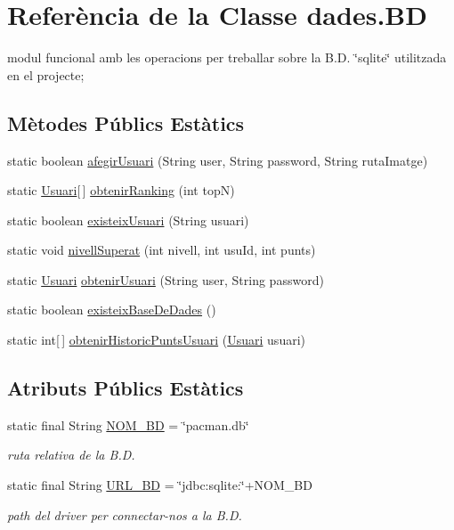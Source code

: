\hypertarget{classdades_1_1_b_d}{\section{Referència de la Classe dades.\+B\+D}
\label{classdades_1_1_b_d}
}


modul funcional amb les operacions per treballar sobre la B.\+D. \char`\"{}sqlite\char`\"{} utilitzada en el projecte;  


\subsection*{Mètodes Públics Estàtics}
\begin{DoxyCompactItemize}
\item 
static boolean \hyperlink{classdades_1_1_b_d_aebeb79a5b559c404967e7af4a51fbe07}{afegir\+Usuari} (String user, String password, String ruta\+Imatge)
\item 
static \hyperlink{classlogica_1_1_usuari}{Usuari}\mbox{[}$\,$\mbox{]} \hyperlink{classdades_1_1_b_d_adecdaacdefdcf4c26e307c3c6b13cbca}{obtenir\+Ranking} (int top\+N)
\item 
static boolean \hyperlink{classdades_1_1_b_d_ad5629c3a6ea389ca0ec6fe6f71f49e5a}{existeix\+Usuari} (String usuari)
\item 
static void \hyperlink{classdades_1_1_b_d_aee65076de634577866799db9ea3315b8}{nivell\+Superat} (int nivell, int usu\+Id, int punts)
\item 
static \hyperlink{classlogica_1_1_usuari}{Usuari} \hyperlink{classdades_1_1_b_d_ae8a0bfc4f5c75e66fd6ba1a6c9568b07}{obtenir\+Usuari} (String user, String password)
\item 
static boolean \hyperlink{classdades_1_1_b_d_a60b00af9b05e556fd66b8dbf69e012cd}{existeix\+Base\+De\+Dades} ()
\item 
static int\mbox{[}$\,$\mbox{]} \hyperlink{classdades_1_1_b_d_a9820e3cbf955816cc7e4e8aabb5d313b}{obtenir\+Historic\+Punts\+Usuari} (\hyperlink{classlogica_1_1_usuari}{Usuari} usuari)
\end{DoxyCompactItemize}
\subsection*{Atributs Públics Estàtics}
\begin{DoxyCompactItemize}
\item 
static final String \hyperlink{classdades_1_1_b_d_a0244ade6a6066ad9f59f8f8e9b2e034e}{N\+O\+M\+\_\+\+B\+D} = \char`\"{}pacman.\+db\char`\"{}
\begin{DoxyCompactList}\small\item\em ruta relativa de la B.\+D. \end{DoxyCompactList}\item 
static final String \hyperlink{classdades_1_1_b_d_abc83c541acdcd0be2ae8a33daa753077}{U\+R\+L\+\_\+\+B\+D} = \char`\"{}jdbc\+:sqlite\+:\char`\"{}+N\+O\+M\+\_\+\+B\+D
\begin{DoxyCompactList}\small\item\em path del driver per connectar-\/nos a la B.\+D. \end{DoxyCompactList}\end{DoxyCompactItemize}
